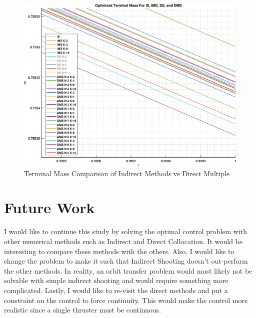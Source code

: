 \documentclass[]{article}
\begin{document}
\begin{figure}
	\centering
	\includegraphics[scale=0.50]{terminlMassCompareMinusDS.eps}
	\caption{Terminal Mass Comparison of Indirect Methods vs Direct Multiple}
	\label{fig:terminlMassCompareMinusDS}
\end{figure}

\section{Future Work}
I would like to continue this study by solving the optimal control problem with other numerical methods such as Indirect and Direct Collocation. It would be interesting to compare these methods with the others. Also, I would like to change the problem to make it such that Indirect Shooting doesn't out-perform the other methods. In reality, an orbit transfer problem would most likely not be solvable with simple indirect shooting and would require something more complicated. Lastly, I would like to re-visit the direct methods and put a constraint on the control to force continuity. This would make the control more realistic since a single thruster must be continuous. 
\end{document}
